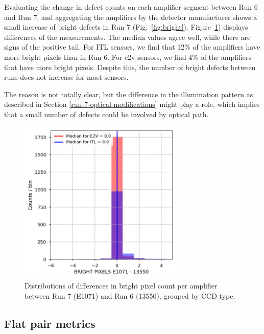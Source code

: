Evaluating the change in defect counts on each amplifier segment between Run 6 and Run 7, and aggregating the amplifiers by the detector manufacturer shows a small increase of bright defects in Run 7 (Fig.~\ref{fig:bright}). Figure~\ref{fig:dark-dist}) displays differences of the measurements. The median values agree well, while there are signs of the positive tail. For ITL sensors, we find that 12\% of the amplifiers have more bright pixels than in Run 6. For e2v sensors, we find 4\% of the amplifiers that have more bright pixels. Despite this, the number of bright defects between runs does not increase for most sensors.

The reason is not totally clear, but the difference in the illumination pattern as described in Section \ref{run-7-optical-modifications} might play a role, which implies that a small number of defects could be involved by optical path.

\begin{figure}[H]
\begin{centering}
\includegraphics[width=0.7\textwidth]{figures/baselineCharacterization/BRIGHT_PIXELS_13550_E1071_diff.png}
\caption{Distributions of differences in bright pixel count per amplifier between Run 7 (E1071) and Run 6 (13550), grouped by CCD type.}
\label{fig:dark-dist}
\end{centering}
\end{figure}

\subsection{Flat pair metrics}\label{flat-pair-metrics}

